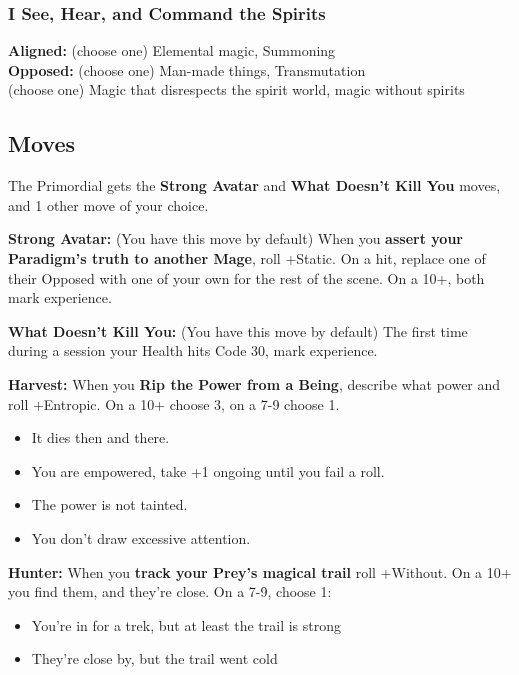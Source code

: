 \documentclass[
]{memoir}
\begin{document}
\hypertarget{i-see-hear-and-command-the-spirits}{%
\subsubsection{I See, Hear, and Command the
Spirits}\label{i-see-hear-and-command-the-spirits}}

\textbf{Aligned:} (choose one) Elemental magic, Summoning\\
\textbf{Opposed:} (choose one) Man-made things, Transmutation\\
(choose one) Magic that disrespects the spirit world, magic without
spirits

\hypertarget{moves-5}{%
\subsection{Moves}\label{moves-5}}

The Primordial gets the \textbf{Strong Avatar} and \textbf{What Doesn't
Kill You} moves, and 1 other move of your choice.

\textbf{Strong Avatar:} (You have this move by default) When you
\textbf{assert your Paradigm's truth to another Mage}, roll +Static. On
a hit, replace one of their Opposed with one of your own for the rest of
the scene. On a 10+, both mark experience.

\textbf{What Doesn't Kill You:} (You have this move by default) The
first time during a session your Health hits Code 30, mark experience.

\textbf{Harvest:} When you \textbf{Rip the Power from a Being}, describe
what power and roll +Entropic. On a 10+ choose 3, on a 7-9 choose 1.

\begin{itemize}
\tightlist
\item
  It dies then and there.
\item
  You are empowered, take +1 ongoing until you fail a roll.
\item
  The power is not tainted.
\item
  You don't draw excessive attention.
\end{itemize}

\textbf{Hunter:} When you \textbf{track your Prey's magical trail} roll
+Without. On a 10+ you find them, and they're close. On a 7-9, choose 1:

\begin{itemize}
\tightlist
\item
  You're in for a trek, but at least the trail is strong
\item
  They're close by, but the trail went cold
\end{itemize}
\end{document}
